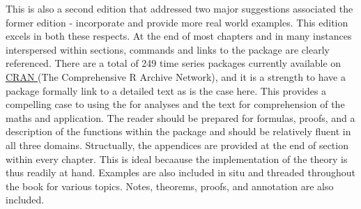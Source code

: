 \documentclass[bookreview]{jss}
\begin{document}
This is also a second edition that addressed two major suggestions associated the former edition - incorporate  and provide more real world examples. This edition excels in both these respects. At the end of most chapters and in many instances interspersed within sections,  commands and links to the package  are clearly referenced. There are a total of 249 time series packages currently available on \href{https://cran.r-project.org/web/views/TimeSeries.html}{CRAN }(The Comprehensive R Archive Network), and it is a strength to have a package formally link to a detailed text as is the case here. This provides a compelling case to using the  for analyses and the text for comprehension of the maths and application. The reader should be prepared for formulas, proofs, and a description of the functions within the  package  and should be relatively fluent in all three domains. Structually, the appendices are provided at the end of section within every chapter. This is ideal becaause the implementation of the theory is thus readily at hand. Examples are also included in situ and threaded throughout the book for various topics. Notes, theorems, proofs, and annotation are also included.  \newline
\end{document}
